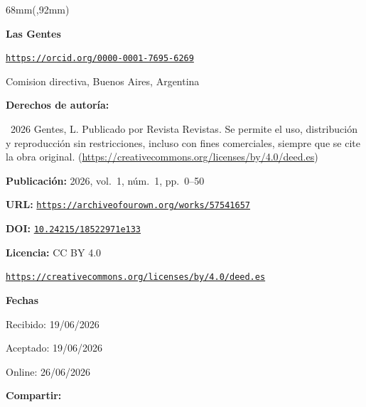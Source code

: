 \begin{textblock*}{68mm}(\gbbloquex,92mm)
{\setlength{\leftskip}{0pt}\setlength{\parindent}{0pt}%
\noindent\begin{minipage}[t]{68mm}
\sffamily\small\setlength{\parskip}{1pt}
{\bfseries\color{azulrevista}Las Gentes}\par
{\scriptsize\texttt{\href{https://orcid.org/0000-0001-7695-6269}{https://orcid.org/0000-0001-7695-6269}}}\par
Comision directiva, Buenos Aires, Argentina\par
\vspace{6pt}
{\bfseries\color{azulrevista!70}Derechos de autor\'ia:}\par
\textcopyright\ 2026 Gentes, L. Publicado por Revista Revistas. Se permite el uso, distribución y reproducción sin restricciones, incluso con fines comerciales, siempre que se cite la obra original. (\href{https://creativecommons.org/licenses/by/4.0/deed.es}{https://creativecommons.org/licenses/by/4.0/deed.es})\par\vspace{6pt}
{\bfseries\color{azulrevista!70}Publicación:} 2026, vol.~1, n\'um.~1, pp.~0--50\par\vspace{6pt}
{\bfseries\color{azulrevista!70}URL:} {\scriptsize\texttt{\href{https://archiveofourown.org/works/57541657}{https://archiveofourown.org/works/57541657}}}\par\vspace{6pt}
{\bfseries\color{azulrevista!70}DOI:} {\scriptsize\texttt{\href{https://doi.org/10.24215/18522971e133}{10.24215/18522971e133}}}\par\vspace{6pt}
{\bfseries\color{azulrevista!70}Licencia:} CC BY 4.0\par
{\scriptsize\texttt{\href{https://creativecommons.org/licenses/by/4.0/deed.es}{https://creativecommons.org/licenses/by/4.0/deed.es}}}\par
\vspace{6pt}
{\bfseries\color{azulrevista!70}Fechas}\par\vspace{2pt}
Recibido: 19/06/2026\par
Aceptado: 19/06/2026\par
Online: 26/06/2026\par
\vspace{6pt}
\vspace{6pt}
{\bfseries\color{azulrevista!70}Compartir:}\par\vspace{3pt}

\end{minipage}}
\end{textblock*}
